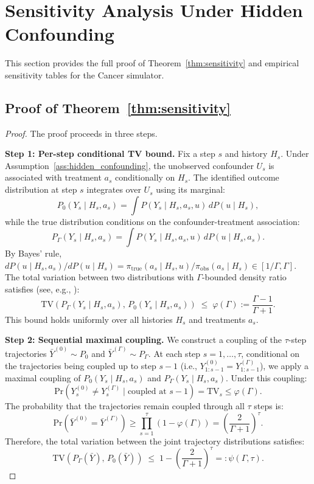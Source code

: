 \documentclass{article}
\renewcommand{\Pr}{\mathrm{Pr}}
\newcommand{\TV}{\mathrm{TV}}
\newcommand{\bY}{\bar{Y}}
\begin{document}
\section{Sensitivity Analysis Under Hidden Confounding}
\label{app:sensitivity}

This section provides the full proof of Theorem~\ref{thm:sensitivity} and empirical sensitivity tables for the Cancer simulator.

\subsection{Proof of Theorem~\ref{thm:sensitivity}}

\begin{proof}
The proof proceeds in three steps.

\textbf{Step 1: Per-step conditional TV bound.}
Fix a step $s$ and history $H_s$. Under Assumption~\ref{ass:hidden_confounding}, the unobserved confounder $U_s$ is associated with treatment $a_s$ conditionally on $H_s$. The identified outcome distribution at step $s$ integrates over $U_s$ using its marginal:
\[
P_0(Y_s \mid H_s, a_s) = \int P(Y_s \mid H_s, a_s, u)\, dP(u \mid H_s),
\]
while the true distribution conditions on the confounder-treatment association:
\[
P_\Gamma(Y_s \mid H_s, a_s) = \int P(Y_s \mid H_s, a_s, u)\, dP(u \mid H_s, a_s).
\]
By Bayes' rule, $dP(u \mid H_s, a_s) / dP(u \mid H_s) = \pi_{\mathrm{true}}(a_s \mid H_s, u) / \pi_{\mathrm{obs}}(a_s \mid H_s) \in [1/\Gamma, \Gamma]$. The total variation between two distributions with $\Gamma$-bounded density ratio satisfies (see, e.g., \citealt{rosenbaum2002observational}):
\begin{equation}
\label{eq:per_step_tv}
\TV(P_\Gamma(Y_s \mid H_s, a_s),\, P_0(Y_s \mid H_s, a_s)) \;\leq\; \varphi(\Gamma) := \frac{\Gamma - 1}{\Gamma + 1}.
\end{equation}
This bound holds uniformly over all histories $H_s$ and treatments $a_s$.

\textbf{Step 2: Sequential maximal coupling.}
We construct a coupling of the $\tau$-step trajectories $\bY^{(0)} \sim P_0$ and $\bY^{(\Gamma)} \sim P_\Gamma$. At each step $s = 1, \ldots, \tau$, conditional on the trajectories being coupled up to step $s-1$ (i.e., $Y^{(0)}_{1:s-1} = Y^{(\Gamma)}_{1:s-1}$), we apply a maximal coupling of $P_0(Y_s \mid H_s, a_s)$ and $P_\Gamma(Y_s \mid H_s, a_s)$. Under this coupling:
\[
\Pr(Y^{(0)}_s \neq Y^{(\Gamma)}_s \mid \text{coupled at } s{-}1) = \TV_s \leq \varphi(\Gamma).
\]
The probability that the trajectories remain coupled through all $\tau$ steps is:
\[
\Pr(\bY^{(0)} = \bY^{(\Gamma)}) \geq \prod_{s=1}^{\tau} (1 - \varphi(\Gamma)) = \left(\frac{2}{\Gamma + 1}\right)^{\!\tau}.
\]
Therefore, the total variation between the joint trajectory distributions satisfies:
\begin{equation}
\label{eq:sequential_tv}
\TV(P_\Gamma(\bY),\, P_0(\bY)) \;\leq\; 1 - \left(\frac{2}{\Gamma + 1}\right)^{\!\tau} =: \psi(\Gamma, \tau).
\end{equation}


\end{proof}
\end{document}
